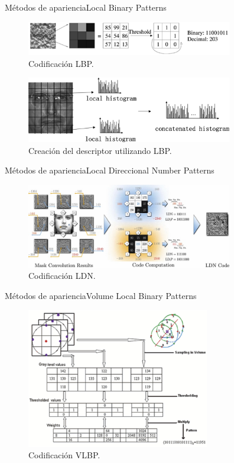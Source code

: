 \documentclass{beamer}
\begin{document}
        \begin{frame}{Métodos de apariencia}{Local Binary Patterns}
            \begin{figure}[bt]
        		\centering
                \includegraphics[width=9cm]{imagenes/lbp.pdf}
          		\caption{Codificación LBP.}
            \end{figure}	

            \begin{figure}[bt]
        		\centering
                \includegraphics[width=9cm]{imagenes/lbp_histogram.png}
          		\caption{Creación del descriptor utilizando LBP.}
            \end{figure}	  
        \end{frame}
        
        \begin{frame}{Métodos de apariencia}{Local Direccional Number Patterns}
            \begin{figure}[bt]
        		\centering
                \includegraphics[width=9cm]{imagenes/ldn.jpg}
          		\caption{Codificación LDN.}
            \end{figure}
        \end{frame}
        
        
        \begin{frame}{Métodos de apariencia}{Volume Local Binary Patterns}
            \begin{figure}[bt]
        		\centering
                \includegraphics[width=8cm]{imagenes/vlbp.pdf}
          		\caption{Codificación VLBP.}
            \end{figure}
        \end{frame}
    
\end{document}
